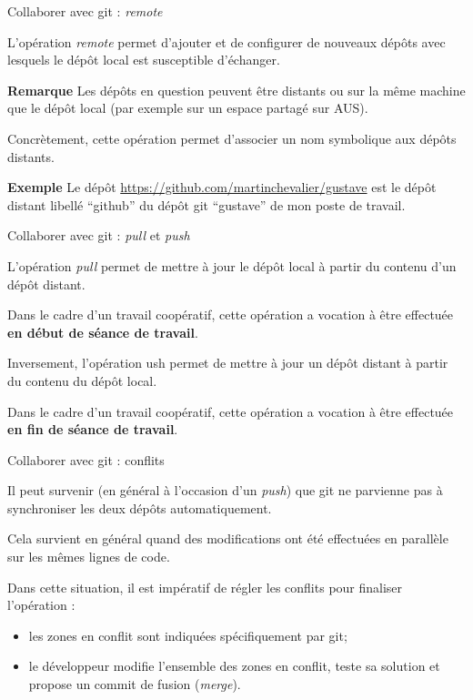 \documentclass[12pt,handout,ignorenonframetext,]{beamer}
\providecommand{\tightlist}{%
  \setlength{\itemsep}{0pt}\setlength{\parskip}{0pt}}
\newcommand{\intertitre}[1]{\textbf{\textcolor{redInsee}{#1}}}
\begin{document}
\begin{frame}{Collaborer avec git : \emph{remote}}

L'opération \emph{remote} permet d'ajouter et de configurer de nouveaux
dépôts avec lesquels le dépôt local est susceptible d'échanger.

\bigskip \pause \intertitre{Remarque} Les dépôts en question peuvent
être distants ou sur la même machine que le dépôt local (par exemple sur
un espace partagé sur AUS).

\bigskip \pause Concrètement, cette opération permet d'associer un nom
symbolique aux dépôts distants.

\bigskip \pause \intertitre{Exemple} Le dépôt
\url{https://github.com/martinchevalier/gustave} est le dépôt distant
libellé ``github'' du dépôt git ``gustave'' de mon poste de travail.

\end{frame}

\begin{frame}{Collaborer avec git : \emph{pull} et \emph{push}}

L'opération \emph{pull} permet de mettre à jour le dépôt local à partir
du contenu d'un dépôt distant.

\bigskip \pause Dans le cadre d'un travail coopératif, cette opération a
vocation à être effectuée \textbf{en début de séance de travail}.

\bigskip \pause Inversement, l'opération ush permet de mettre à jour un
dépôt distant à partir du contenu du dépôt local.

\bigskip \pause Dans le cadre d'un travail coopératif, cette opération a
vocation à être effectuée \textbf{en fin de séance de travail}.

\end{frame}

\begin{frame}{Collaborer avec git : conflits}

Il peut survenir (en général à l'occasion d'un \emph{push}) que git ne
parvienne pas à synchroniser les deux dépôts automatiquement.

\bigskip \pause Cela survient en général quand des modifications ont été
effectuées en parallèle sur les mêmes lignes de code.

\bigskip \pause Dans cette situation, il est impératif de régler les
conflits pour finaliser l'opération :

\begin{itemize}
\tightlist
\item
  les zones en conflit sont indiquées spécifiquement par git;
\item
  le développeur modifie l'ensemble des zones en conflit, teste sa
  solution et propose un commit de fusion (\emph{merge}).
\end{itemize}

\end{frame}
\end{document}
